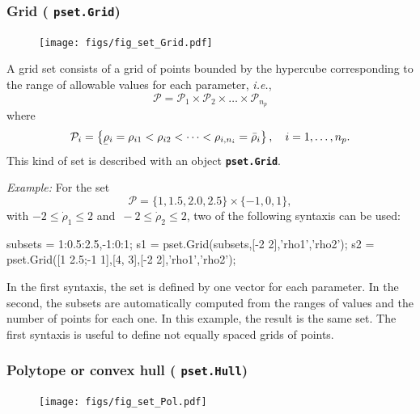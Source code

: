 \documentclass[fleqn,11pt]{article}
\newcommand{\lcode}[1]{\textbf{%
    \lstinline[style=mystyle]{#1}}}
\newcommand{\p}{\rho}
\newcommand{\Pset}{\mathcal{P}}
\newcommand{\maxS}[1]{\bar{#1}}
\newcommand{\minS}[1]{\underaccent{\bar}{#1}}
\newcommand{\ie}{{\em i.e.}\xspace}
\newcommand{\example}{\noindent\emph{Example:}\xspace}
\begin{document}
\subsubsection{Grid (\texorpdfstring{\lcode{pset.Grid}}{pset.Grid})}\label{sssec:grid}

\begin{figure}
  \vspace{-5ex}
  \centering
  \texttt{[image: figs/fig\_set\_Grid.pdf]}
\end{figure}
A grid set consists of a grid of points bounded by the hypercube corresponding to the range of allowable values for each parameter, \ie,
\begin{equation*}
    \Pset = \Pset_1 \times \Pset_2 \times \dots \times \Pset_{n_p}
\end{equation*}
where
\begin{equation*}
    \Pset_i = \left\{\minS{\p}_i=\p_{i1}<\p_{i2}<\dots<\p_{i,n_i}=\maxS{\p}_i\right\},
    \quad i=1,\dots,n_p.
\end{equation*}
This kind of set is described with an object \lcode{pset.Grid}.

\example For the set
\begin{equation*}
    \Pset = \{1,1.5,2.0,2.5\}\times\{-1,0,1\},
\end{equation*}
with $-2\leq\dot\p_1\leq 2$ and $\,-2\leq\dot\p_2\leq 2$, two of the following syntaxis can be used:
\begin{code}
subsets = {1:0.5:2.5,-1:0:1};
s1 = pset.Grid(subsets,[-2 2],{'rho1','rho2'});
s2 = pset.Grid([1 2.5;-1 1],[4, 3],[-2 2],{'rho1','rho2'});
\end{code}
In the first syntaxis, the set is defined by one vector for each parameter. In the second, the subsets are automatically computed from the ranges of values and the number of points for each one. In this example, the result is the same set. The first syntaxis is useful to define not equally spaced grids of points.

\subsubsection{Polytope or convex hull (\texorpdfstring{\lcode{pset.Hull}}{pset.Hull})}\label{sssec:hull}

\begin{figure}
  \vspace{-5ex}
  \centering
  \texttt{[image: figs/fig\_set\_Pol.pdf]}
\end{figure}
\end{document}
